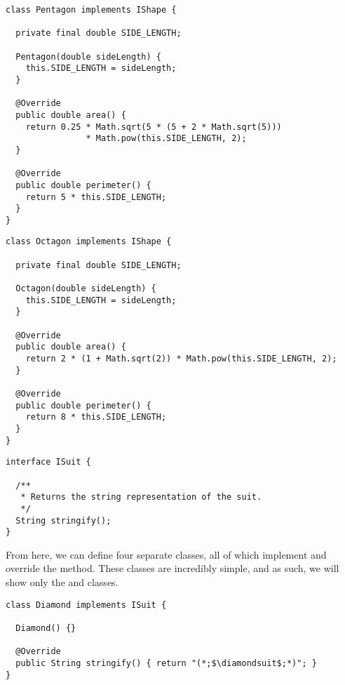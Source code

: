 \begin{lstlisting}[language=MyJava]
class Pentagon implements IShape {
  
  private final double SIDE_LENGTH;

  Pentagon(double sideLength) { 
    this.SIDE_LENGTH = sideLength; 
  }

  @Override
  public double area() {
    return 0.25 * Math.sqrt(5 * (5 + 2 * Math.sqrt(5))) 
                * Math.pow(this.SIDE_LENGTH, 2);
  }

  @Override
  public double perimeter() {
    return 5 * this.SIDE_LENGTH;
  }
}
\end{lstlisting}

\begin{lstlisting}[language=MyJava]
class Octagon implements IShape {

  private final double SIDE_LENGTH;

  Octagon(double sideLength) { 
    this.SIDE_LENGTH = sideLength; 
  }

  @Override
  public double area() {
    return 2 * (1 + Math.sqrt(2)) * Math.pow(this.SIDE_LENGTH, 2);
  }

  @Override
  public double perimeter() {
    return 8 * this.SIDE_LENGTH;
  }
}
\end{lstlisting}


\begin{lstlisting}[language=MyJava]
interface ISuit {

  /**
   * Returns the string representation of the suit.
   */
  String stringify();
}
\end{lstlisting}

From here, we can define four separate classes, all of which implement  and override the  method. These classes are incredibly simple, and as such, we will show only the  and  classes.

\begin{lstlisting}[language=MyJava]
class Diamond implements ISuit {
  
  Diamond() {}

  @Override
  public String stringify() { return "(*;$\diamondsuit$;*)"; }
}
\end{lstlisting}

